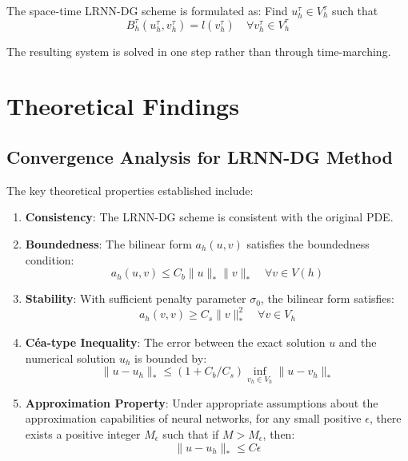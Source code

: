 \documentclass[11pt,a4paper]{article}
\begin{document}
The space-time LRNN-DG scheme is formulated as: Find $u_h^{\tau} \in V_h^{\tau}$ such that
\begin{equation}
B_h^{\tau}(u_h^{\tau}, v_h^{\tau}) = l(v_h^{\tau}) \quad \forall v_h^{\tau} \in V_h^{\tau}
\end{equation}

The resulting system is solved in one step rather than through time-marching.

\section{Theoretical Findings}

\subsection{Convergence Analysis for LRNN-DG Method}

The key theoretical properties established include:

\begin{enumerate}
    \item \textbf{Consistency}: The LRNN-DG scheme is consistent with the original PDE.
    
    \item \textbf{Boundedness}: The bilinear form $a_h(u,v)$ satisfies the boundedness condition:
    \begin{equation}
    a_h(u,v) \leq C_b \|u\|_* \|v\|_* \quad \forall v \in V(h)
    \end{equation}
    
    \item \textbf{Stability}: With sufficient penalty parameter $\sigma_0$, the bilinear form satisfies:
    \begin{equation}
    a_h(v,v) \geq C_s \|v\|_*^2 \quad \forall v \in V_h
    \end{equation}
    
    \item \textbf{Céa-type Inequality}: The error between the exact solution $u$ and the numerical solution $u_h$ is bounded by:
    \begin{equation}
    \|u - u_h\|_* \leq (1 + C_b/C_s) \inf_{v_h \in V_h} \|u - v_h\|_*
    \end{equation}
    
    \item \textbf{Approximation Property}: Under appropriate assumptions about the approximation capabilities of neural networks, for any small positive $\epsilon$, there exists a positive integer $M_{\epsilon}$ such that if $M > M_{\epsilon}$, then:
    \begin{equation}
    \|u - u_h\|_* \leq C\epsilon
    \end{equation}
\end{enumerate}
\end{document}
